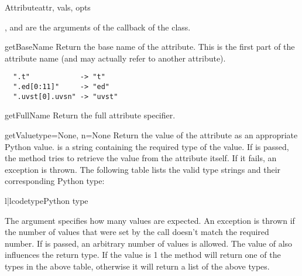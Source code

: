 \begin{classdesc}{Attribute}{attr, vals, opts}

,  and  are the arguments of the 
 callback of the  class.

\end{classdesc}

\begin{methoddesc}{getBaseName}{}
Return the base name of the attribute. This is the first part of the
attribute name (and may actually refer to another attribute).

\begin{verbatim}
  ".t"            -> "t"
  ".ed[0:11]"     -> "ed"
  ".uvst[0].uvsn" -> "uvst"
\end{verbatim}
\end{methoddesc}

\begin{methoddesc}{getFullName}{}
Return the full attribute specifier.
\end{methoddesc}

\begin{methoddesc}{getValue}{type=None, n=None}
Return the value of the attribute as an appropriate Python value.
 is a string containing the required type of the value.
If  is passed, the method tries to retrieve the value from
the attribute itself. If it fails, an exception is thrown. The following
table lists the valid type strings and their corresponding Python type:

\begin{tableii}{l|l}{code}{type}{Python type}
\end{tableii}

The argument  specifies how many values are expected. An exception
is thrown if the number of values that were set by the  call
doesn't match the required number. If  is passed, an arbitrary
number of values is allowed. The value of  also influences the
return type. If the value is 1 the method will return one of the types
in the above table, otherwise it will return a list of the above types.

\end{methoddesc}

